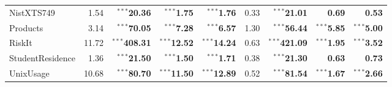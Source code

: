\documentclass{article}
\newcommand{\schemaForTable}[1]{#1\xspace}
\newcommand{\NistXTSNineForTable}{\schemaForTable{NistXTS749}}
\newcommand{\ProductsForTable}{\schemaForTable{Products}}
\newcommand{\RiskItForTable}{\schemaForTable{RiskIt}}
\newcommand{\StudentResidenceForTable}{\schemaForTable{StudentResidence}}
\newcommand{\UnixUsageForTable}{\schemaForTable{UnixUsage}}
\begin{document}
\begin{table}[!ht]
\begin{center}
{\begin{tabular}{lrrrr|rrrr}
\NistXTSNineForTable&1.54&$^{\ast\ast\ast}$\textbf{20.36}&$^{\ast\ast\ast}$\textbf{1.75}&$^{\ast\ast\ast}$\textbf{1.76}&0.33&$^{\ast\ast\ast}$\textbf{21.01}&\textbf{0.69}&\textbf{0.53}\\
\ProductsForTable&3.14&$^{\ast\ast\ast}$\textbf{70.05}&$^{\ast\ast\ast}$\textbf{7.28}&$^{\ast\ast\ast}$\textbf{6.57}&1.30&$^{\ast\ast\ast}$\textbf{56.44}&$^{\ast\ast\ast}$\textbf{5.85}&$^{\ast\ast\ast}$\textbf{5.00}\\
\RiskItForTable&11.72&$^{\ast\ast\ast}$\textbf{408.31}&$^{\ast\ast\ast}$\textbf{12.52}&$^{\ast\ast\ast}$\textbf{14.24}&0.63&$^{\ast\ast\ast}$\textbf{421.09}&$^{\ast\ast\ast}$\textbf{1.95}&$^{\ast\ast\ast}$\textbf{3.52}\\
\StudentResidenceForTable&1.36&$^{\ast\ast\ast}$\textbf{21.50}&$^{\ast\ast\ast}$\textbf{1.50}&$^{\ast\ast\ast}$\textbf{1.71}&0.38&$^{\ast\ast\ast}$\textbf{21.30}&\textbf{0.63}&\textbf{0.73}\\
\UnixUsageForTable&10.68&$^{\ast\ast\ast}$\textbf{80.70}&$^{\ast\ast\ast}$\textbf{11.50}&$^{\ast\ast\ast}$\textbf{12.89}&0.52&$^{\ast\ast\ast}$\textbf{81.54}&$^{\ast\ast\ast}$\textbf{1.67}&$^{\ast\ast\ast}$\textbf{2.66}\\      \hline
      \end{tabular}
    }
  \end{center}
\end{table}
\end{document}
